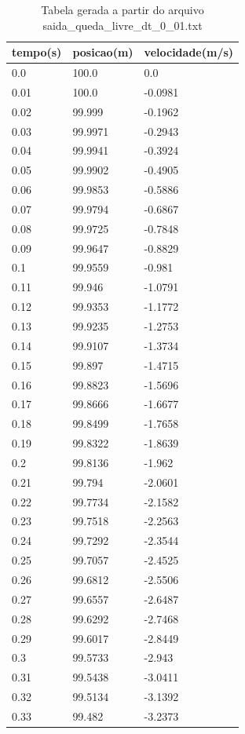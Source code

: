 \begin{table}
\caption{Tabela gerada a partir do arquivo saida\_queda\_livre\_dt\_0\_01.txt}
\label{tab:saida_queda_livre_dt_0_01}
\begin{tabular}{lll}
\toprule
tempo(s) & posicao(m) & velocidade(m/s) \\
\midrule
0.0 & 100.0 & 0.0 \\
0.01 & 100.0 & -0.0981 \\
0.02 & 99.999 & -0.1962 \\
0.03 & 99.9971 & -0.2943 \\
0.04 & 99.9941 & -0.3924 \\
0.05 & 99.9902 & -0.4905 \\
0.06 & 99.9853 & -0.5886 \\
0.07 & 99.9794 & -0.6867 \\
0.08 & 99.9725 & -0.7848 \\
0.09 & 99.9647 & -0.8829 \\
0.1 & 99.9559 & -0.981 \\
0.11 & 99.946 & -1.0791 \\
0.12 & 99.9353 & -1.1772 \\
0.13 & 99.9235 & -1.2753 \\
0.14 & 99.9107 & -1.3734 \\
0.15 & 99.897 & -1.4715 \\
0.16 & 99.8823 & -1.5696 \\
0.17 & 99.8666 & -1.6677 \\
0.18 & 99.8499 & -1.7658 \\
0.19 & 99.8322 & -1.8639 \\
0.2 & 99.8136 & -1.962 \\
0.21 & 99.794 & -2.0601 \\
0.22 & 99.7734 & -2.1582 \\
0.23 & 99.7518 & -2.2563 \\
0.24 & 99.7292 & -2.3544 \\
0.25 & 99.7057 & -2.4525 \\
0.26 & 99.6812 & -2.5506 \\
0.27 & 99.6557 & -2.6487 \\
0.28 & 99.6292 & -2.7468 \\
0.29 & 99.6017 & -2.8449 \\
0.3 & 99.5733 & -2.943 \\
0.31 & 99.5438 & -3.0411 \\
0.32 & 99.5134 & -3.1392 \\
0.33 & 99.482 & -3.2373 \\

\end{tabular}
\end{table}
